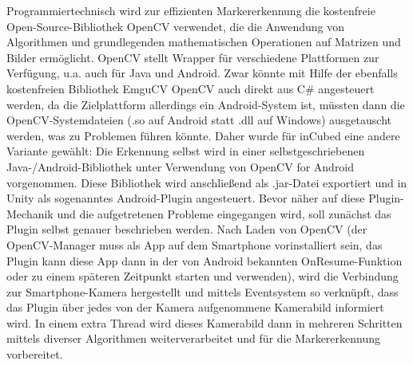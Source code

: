Programmiertechnisch wird zur effizienten Markererkennung die kostenfreie Open-Source-Bibliothek OpenCV verwendet, die die Anwendung von Algorithmen und grundlegenden mathematischen Operationen auf Matrizen und Bilder ermöglicht. OpenCV stellt Wrapper für verschiedene Plattformen zur Verfügung, u.a. auch für Java und Android. Zwar könnte mit Hilfe der ebenfalls kostenfreien Bibliothek EmguCV OpenCV auch direkt aus C\# angesteuert werden, da die Zielplattform allerdings ein Android-System ist, müssten dann die OpenCV-Systemdateien (.so auf Android statt .dll auf Windows) ausgetauscht werden, was zu Problemen führen könnte. Daher wurde für inCubed eine andere Variante gewählt: Die Erkennung selbst wird in einer selbstgeschriebenen Java-/Android-Bibliothek unter Verwendung von OpenCV for Android vorgenommen. Diese Bibliothek wird anschließend als .jar-Datei exportiert und in Unity als sogenanntes Android-Plugin angesteuert. Bevor näher auf diese Plugin-Mechanik und die aufgetretenen Probleme eingegangen wird, soll zunächst das Plugin selbst genauer beschrieben werden. Nach Laden von OpenCV (der OpenCV-Manager muss als App auf dem Smartphone vorinstalliert sein, das Plugin kann diese App dann in der von Android bekannten OnResume-Funktion oder zu einem späteren Zeitpunkt starten und verwenden), wird die Verbindung zur Smartphone-Kamera hergestellt und mittels Eventsystem so verknüpft, dass das Plugin über jedes von der Kamera aufgenommene Kamerabild informiert wird. In einem extra Thread wird dieses Kamerabild dann in mehreren Schritten mittels diverser Algorithmen weiterverarbeitet und für die Markererkennung vorbereitet.

